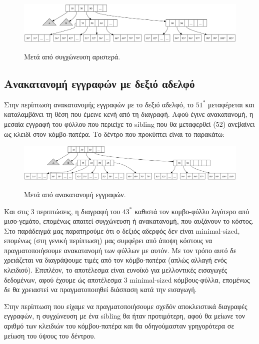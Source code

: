 \documentclass[a4paper,11pt]{article}
\begin{document}
\begin{figure}[h]
\centering
\includegraphics[width=1\textwidth]{../files/tree1b.png}\\
\caption{Μετά από συγχώνευση αριστερά.}
\end{figure}

\pagebreak

\subsection {Ανακατανομή εγγραφών με δεξιό αδελφό}
Στην περίπτωση ανακατανομής εγγραφών με το δεξιό αδελφό, το $51^*$ μεταφέρεται
και καταλαμβάνει τη θέση που έμεινε κενή από τη διαγραφή. Αφού έγινε
ανακατανομή, η μεσαία εγγραφή του φύλλου που περιείχε το sibling που θα
μεταφερθεί (52) ανεβαίνει ως κλειδί στον κόμβο-πατέρα. Το δέντρο που προκύπτει
είναι το παρακάτω:

\begin{figure}[h]
\centering
\includegraphics[width=1\textwidth]{../files/tree1c.png}\\
\caption{Μετά από ανακατανομή εγγραφών.}
\end{figure}

Και στις 3 περιπτώσεις, η διαγραφή του $43^*$ καθιστά τον κομβο-φύλλο λιγότερο
από μισο-γεμάτο, επομένως απαιτεί συγχώνευση ή ανακατανομή, που αυξάνουν το
κόστος.
Στο παράδειγμά μας παρατηρούμε ότι ο δεξιός αδερφός δεν είναι
minimal-sized, επομένως (στη γενική περίπτωση) μας συμφέρει από άποψη κόστους
να πραγματοποιήσουμε ανακατανομή των φύλλων με αυτόν. Με τον τρόπο αυτό δε
χρειάζεται να διαγράψουμε τιμές από τον κόμβο-πατέρα (απλώς αλλαγή ενός
κλειδιού). Επιπλέον, το αποτέλεσμα είναι ευνοϊκό για μελλοντικές εισαγωγές
δεδομένων, αφού έχουμε ώς αποτέλεσμα 3 minimal-sized κόμβους-φύλλα, επομένως
δε θα χρειαστεί να πραγματοποιηθεί διάσπαση κατά την εισαγωγή.

Στην περίπτωση που είχαμε να πραγματοποιήσουμε σχεδόν αποκλειστικά διαγραφές
εγγραφών, η συγχώνευση με ένα sibling θα ήταν προτιμότερη, αφού θα μείωνε τον
αριθμό των κλειδιών του κόμβου-πατέρα και θα οδηγούμασταν γρηγορότερα σε
μείωση του ύψους του δέντρου.
\end{document}
